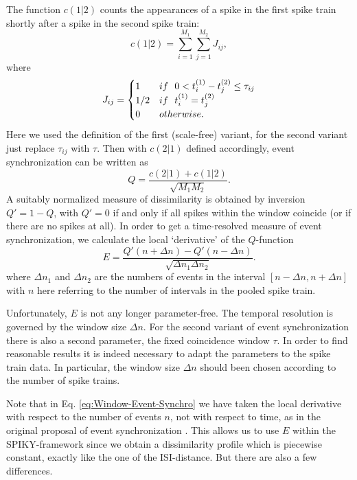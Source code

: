 \documentclass[10pt,twocolumn]{elsart5p}
\begin{document}
The function $c(1|2)$ counts the appearances of a spike in the first spike train shortly after a spike in the second spike train:
%
\begin{equation} \label{eq:Event-Count}
    c (1|2) = \sum_{i=1}^{M_1} \sum_{j=1}^{M_2} J_{ij},
\end{equation}
%
where
%
\begin{equation} \label{eq:Event-Synchronicity}
    J_{ij} = \begin{cases}
                      1     & {\rm if} ~~ 0 < t_i^{(1)} - t_j^{(2)} \leq \tau_{ij} \cr
                      1/2   & {\rm if} ~~ t^{(1)}_i = t^{(2)}_j \cr
                      0     & {\rm otherwise}.
                  \end{cases}
\end{equation}
%
Here we used the definition of the first (scale-free) variant, for the second variant just replace $\tau_{ij}$ with $\tau$. Then with $c(2|1)$ defined accordingly, event synchronization can be written as
%
\begin{equation} \label{eq:Event-Synchro}
    Q = \frac {c (2|1) + c (1|2)} {\sqrt{M_1 M_2}}.
\end{equation}
%
A suitably normalized measure of dissimilarity is obtained by inversion $Q'=1-Q$, with $Q' = 0$ if and only if all spikes within the window coincide (or if there are no spikes at all).
%
In order to get a time-resolved measure of event synchronization, we calculate the local `derivative' of the $Q$-function
%
\begin{equation} \label{eq:Window-Event-Synchro}
    E = \frac {Q' (n+\Delta n) - Q' (n-\Delta n)} {\sqrt{\Delta n_1 \Delta n_2}}.
\end{equation}
%
where $\Delta n_1$ and $\Delta n_2$ are the numbers of events in the interval $[n-\Delta n, n+\Delta n]$ with $n$ here referring to the number of intervals in the pooled spike train.

Unfortunately, $E$ is not any longer parameter-free. The temporal resolution is governed by the window size $\Delta n$. For the second variant of event synchronization there is also a second parameter, the fixed coincidence window $\tau$. In order to find reasonable results it is indeed necessary to adapt the parameters to the spike train data. In particular, the window size $\Delta n$
should been chosen according to the number of spike trains.

Note that in Eq. \ref{eq:Window-Event-Synchro} we have taken the local derivative with respect to the number of events $n$, not with respect to time, as in the original proposal of event synchronization \citep{QuianQuiroga02b}. This allows us to use $E$ within the SPIKY-framework since we obtain a dissimilarity profile which is piecewise constant, exactly like the one of the ISI-distance. But there are also a few differences.
\end{document}
